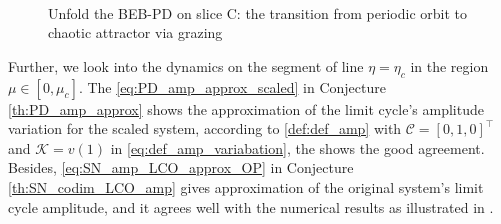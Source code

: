\begin{figure}[h!]
	\centering
	\\
	\caption{Unfold the BEB-PD on slice C: the transition from periodic orbit to chaotic attractor via grazing}
	\label{fig:slice_C_phase_portraits}
\end{figure}

%

Further, we look into the dynamics on the segment of line $\eta = \eta_c$ in the region $\mu \in [0,\mu_c]$. The
\cref{eq:PD_amp_approx_scaled} in Conjecture \cref{th:PD_amp_approx} shows the approximation of the limit
cycle's amplitude variation for the scaled system, according to \cref{def:def_amp} with $\mathcal{C} = [0,1,
0]^{\top}$ and $\mathcal{K} = v(1)$ in \cref{eq:def_amp_variabation}, the  shows the
good agreement.
Besides, \cref{eq:SN_amp_LCO_approx_OP} in Conjecture \cref{th:SN_codim_LCO_amp} gives approximation of the
original system's limit cycle amplitude, and it agrees well with the numerical results as illustrated in
.
%